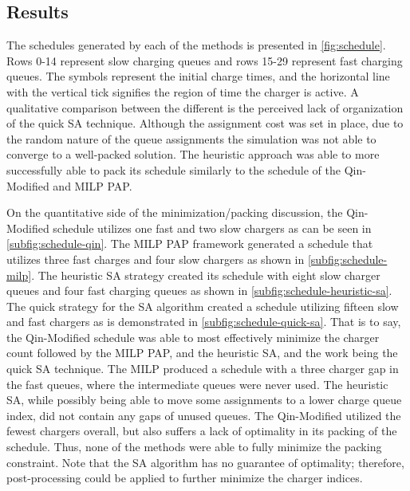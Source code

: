 \documentclass[energies,article,submit,moreauthors]{Definitions/mdpi}
\begin{document}
\subsection{Results}
\label{sec:results}
The schedules generated by each of the methods is presented in \ref{fig:schedule}. Rows 0-14 represent slow charging
queues and rows 15-29 represent fast charging queues. The symbols represent the initial charge times, and the horizontal
line with the vertical tick signifies the region of time the charger is active. A qualitative comparison between the
different is the perceived lack of organization of the quick SA technique. Although the assignment cost was set in
place, due to the random nature of the queue assignments the simulation was not able to converge to a well-packed
solution. The heuristic approach was able to more successfully able to pack its schedule similarly to the schedule of
the Qin-Modified and MILP PAP.

On the quantitative side of the minimization/packing discussion, the Qin-Modified schedule utilizes one fast and two
slow chargers as can be seen in \ref{subfig:schedule-qin}. The MILP PAP framework generated a schedule that utilizes
three fast charges and four slow chargers as shown in \ref{subfig:schedule-milp}. The heuristic SA strategy created its
schedule with eight slow charger queues and four fast charging queues as shown in \ref{subfig:schedule-heuristic-sa}.
The quick strategy for the SA algorithm created a schedule utilizing fifteen slow and fast chargers as is demonstrated
in \ref{subfig:schedule-quick-sa}. That is to say, the Qin-Modified schedule was able to most effectively minimize the
charger count followed by the MILP PAP, and the heuristic SA, and the work being the quick SA technique. The MILP
produced a schedule with a three charger gap in the fast queues, where the intermediate queues were never used. The
heuristic SA, while possibly being able to move some assignments to a lower charge queue index, did not contain any gaps
of unused queues. The Qin-Modified utilized the fewest chargers overall, but also suffers a lack of optimality in its
packing of the schedule. Thus, none of the methods were able to fully minimize the packing constraint. Note that the SA
algorithm has no guarantee of optimality; therefore, post-processing could be applied to further minimize the charger
indices.
\end{document}
